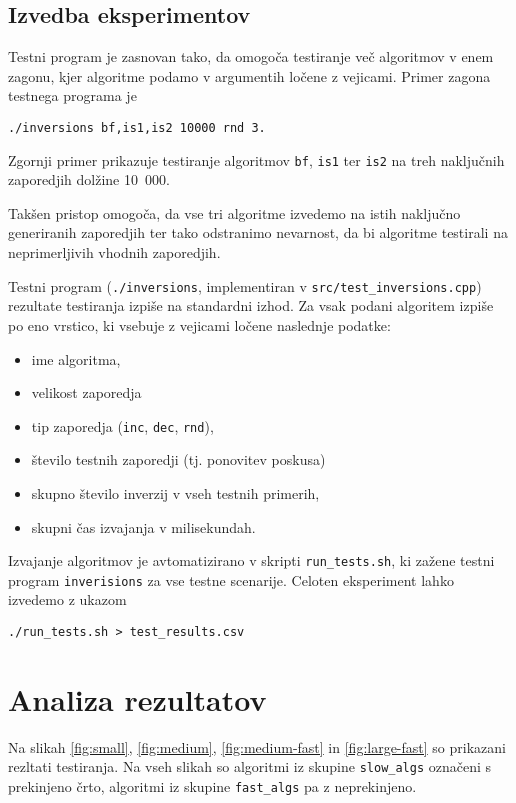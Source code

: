 \documentclass[11pt,a4paper]{article}
\theoremstyle{plain}
\theoremstyle{definition}
\begin{document}
\subsection{Izvedba eksperimentov}

Testni program je zasnovan tako, da omogoča testiranje več algoritmov v enem zagonu, kjer algoritme podamo v argumentih ločene z vejicami. Primer zagona testnega programa je
\begin{lstlisting}
./inversions bf,is1,is2 10000 rnd 3.
\end{lstlisting}
Zgornji primer prikazuje testiranje algoritmov \lstinline!bf!, \lstinline!is1! ter \lstinline!is2! na treh naključnih zaporedjih dolžine 10~000.

Takšen pristop omogoča, da vse tri algoritme izvedemo na istih naključno generiranih zaporedjih ter tako odstranimo nevarnost, da bi algoritme testirali na neprimerljivih vhodnih zaporedjih.

Testni program (\lstinline!./inversions!, implementiran v \lstinline!src/test_inversions.cpp!) rezultate testiranja izpiše na standardni izhod. Za vsak podani algoritem izpiše po eno vrstico, ki vsebuje z vejicami ločene naslednje podatke:
\begin{itemize}
\item ime algoritma,
\item velikost zaporedja
\item tip zaporedja (\lstinline!inc!, \lstinline!dec!, \lstinline!rnd!),
\item število testnih zaporedji (tj. ponovitev poskusa)
\item skupno število inverzij v vseh testnih primerih,
\item skupni čas izvajanja v milisekundah.
\end{itemize}

Izvajanje algoritmov je avtomatizirano v skripti \lstinline!run_tests.sh!, ki zažene testni program \lstinline!inverisions! za vse testne scenarije. Celoten eksperiment lahko izvedemo z ukazom
\begin{lstlisting}
./run_tests.sh > test_results.csv
\end{lstlisting}

\section{Analiza rezultatov}

Na slikah \ref{fig:small}, \ref{fig:medium}, \ref{fig:medium-fast} in \ref{fig:large-fast} so prikazani rezltati testiranja. Na vseh slikah so algoritmi iz skupine \lstinline!slow_algs! označeni s prekinjeno črto, algoritmi iz skupine \lstinline!fast_algs! pa z neprekinjeno.
\end{document}
